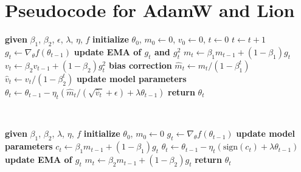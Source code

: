 \documentclass{article}
\newcommand{\name}{Lion}
\begin{document}




\newpage
\appendix


\section{Pseudocode for AdamW and \name{}}
\begin{minipage}{.48\linewidth}
\begin{algorithm}[H]
    \caption{AdamW Optimizer}
    \begin{algorithmic}
    \State \textbf{given} $\beta_1$, $\beta_2$, $\epsilon$, $\lambda$, $\eta$, $f$
    \State \textbf{initialize} $\theta_0$, $m_0\leftarrow 0$, $v_0\leftarrow 0$, $t\leftarrow 0$
        \State $t \leftarrow t + 1$
        \State $g_t \leftarrow \nabla_\theta f(\theta_{t-1})$
        \State \textbf{update EMA of $g_t$ and $g^2_t$}
        \State $m_t \leftarrow \beta_1 m_{t-1} + (1 - \beta_1)g_t$
        \State $v_t \leftarrow \beta_2 v_{t-1} + (1 - \beta_2)g^2_t$
        \State \textbf{bias correction}
        \State $\hat{m}_t \leftarrow m_t / (1 - \beta^t_1)$
        \State $\hat{v}_t \leftarrow v_t / (1 - \beta^t_2)$
        \State \textbf{update model parameters}
        \State $\theta_t \leftarrow \theta_{t-1} - \eta_t(\hat{m}_t/(\sqrt{\hat{v}_t} + \epsilon) + \lambda\theta_{t-1})$
    \EndWhile
    \State \textbf{return} $\theta_t$
    \end{algorithmic}
    \label{alg:adamw}
\end{algorithm}
\end{minipage}\enskip\enskip\enskip\,%
\begin{minipage}{.48\linewidth}
\begin{algorithm}[H]
    \caption{\name{} Optimizer (ours)}
    \begin{algorithmic}
    \State \textbf{given} $\beta_1$, $\beta_2$, $\lambda$, $\eta$, $f$
    \State \textbf{initialize} $\theta_0$, $m_0\leftarrow 0$
        \State $g_t \leftarrow \nabla_\theta f(\theta_{t-1})$
        \State \textbf{update model parameters}
        \State $c_t \leftarrow \beta_1 m_{t-1} + (1-\beta_1)g_t$
        \State $\theta_t \leftarrow \theta_{t-1} - \eta_t(\text{sign}(c_t) + \lambda\theta_{t-1})$
        \State \textbf{update EMA of $g_t$}
        \State $m_t \leftarrow \beta_2 m_{t-1} + (1 - \beta_2)g_t$
    \EndWhile
    \State \textbf{return} $\theta_t$
    \end{algorithmic}
    \label{alg:ours}
\end{algorithm}
\end{minipage}
\end{document}
